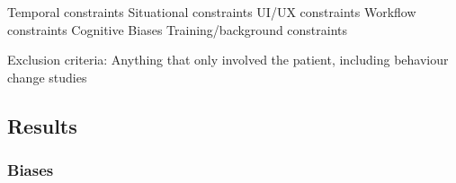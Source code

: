 \documentclass{sigchi}
\begin{document}
Temporal constraints
Situational constraints
UI/UX constraints 
Workflow constraints
Cognitive Biases
Training/background constraints

Exclusion criteria:
  Anything that only involved the patient, including behaviour change studies

\subsection{Results}

\subsubsection{Biases}







\end{document}
